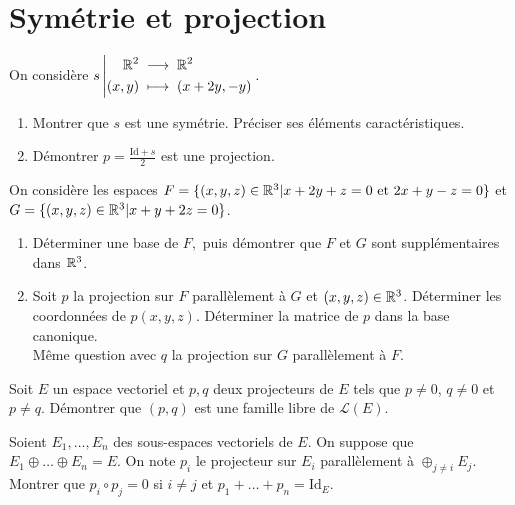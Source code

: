 \documentclass{book}
\begin{document}
\section{Symétrie et projection}
\begin{Exercice}
On considère ${s}\left|\begin{aligned}{\mathbb{R}^2}&\;\longrightarrow\;{\mathbb{R}^2}\\{(x,y)}&\;\longmapsto\;{(x + 2y, -y)}\end{aligned}\right..$
\begin{enumerate}
\item Montrer que $s$ est une symétrie. Préciser ses éléments caractéristiques.
\item Démontrer $p=\frac{\mathrm{Id}+s}{2}$ est une projection.
\end{enumerate}
\end{Exercice}
\begin{Exercice}
On considère les espaces $F = \{(x, y, z) \in \mathbb{R}^3| x+2y+z = 0\text{ et }2x+y-z = 0\}$ et $G = \{(x, y, z) \in \mathbb{R}^3| x+y+2z = 0\}$.
\begin{enumerate}
\item Déterminer une base de $F,$ puis démontrer que $F$ et $G$ sont supplémentaires dans $\mathbb{R}^3$.
\item  Soit $p$ la projection sur $F$ parallèlement à $G$ et $(x, y, z) \in \mathbb{R}^3$. Déterminer les
coordonnées de $p(x,y,z)$. Déterminer la matrice de $p$ dans la base canonique.\\
Même question avec $q$ la projection sur $G$ parallèlement à $F$.
\end{enumerate}
\end{Exercice}
\begin{Exercice}
Soit $E$ un espace vectoriel et $p,q$ deux projecteurs de $E$ tels que $p\neq 0$, $q\neq 0$ et $p\neq q$. Démontrer que $(p,q)$ est une famille libre de $\mathcal{L}(E)$.
\end{Exercice}
\begin{Exercice}
Soient $E_1,\dots ,E_n$ des sous-espaces vectoriels de $E$. On suppose que $E_1\oplus \dots \oplus E_n=E$. On note $p_i$ le projecteur sur $E_i$ parallèlement à $\oplus_{j\neq i}E_j$.\\ 
Montrer que $p_i\circ p_j=0$ si $i\neq j$ et $p_1+\dots+p_n=\mathrm{Id}_E$.
\end{Exercice}
%
%
%
\end{document}
